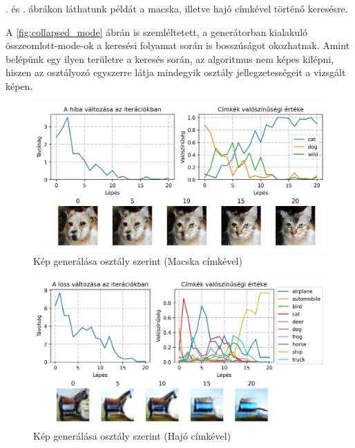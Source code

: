 . és . ábrákon láthatunk példát a macska, illetve hajó címkével történő keresésre.

A \ref{fig:collapsed_mode} ábrán is szemléltetett, a generátorban kialakuló összeomlott-mode-ok a keresési folyamat során is bosszúságot okozhatnak. Amint belépünk egy ilyen területre a keresés során, az algoritmus nem képes kilépni, hiszen az osztályozó egyszerre látja mindegyik osztály jellegzetességeit a vizsgált képen.


\begin{figure}[h]
	\centering
	\includegraphics[width=\textwidth]{images/searching-cat.png}
	\caption{Kép generálása osztály szerint (Macska címkével)}
	\label{fig:searching}
\end{figure}

\begin{figure}[h]
	\centering
	\includegraphics[width=\textwidth]{images/searching-cifar_ship.png}
	\caption{Kép generálása osztály szerint (Hajó címkével)}
	\label{fig:searching_ship}
\end{figure}


